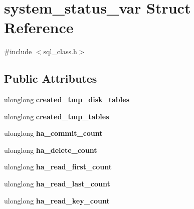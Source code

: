 \hypertarget{structsystem__status__var}{}\section{system\+\_\+status\+\_\+var Struct Reference}
\label{structsystem__status__var}


{\ttfamily \#include $<$sql\+\_\+class.\+h$>$}

\subsection*{Public Attributes}
\begin{DoxyCompactItemize}
\item 
\mbox{\label{structsystem__status__var_a622d653598bf89a392267564e390d94a}} 
ulonglong {\bfseries created\+\_\+tmp\+\_\+disk\+\_\+tables}
\item 
\mbox{\label{structsystem__status__var_a9b0a0c0bd7251ad1b611e9e6f4ef64b6}} 
ulonglong {\bfseries created\+\_\+tmp\+\_\+tables}
\item 
\mbox{\label{structsystem__status__var_ae0a16355cf94560a365511ff3f416ba1}} 
ulonglong {\bfseries ha\+\_\+commit\+\_\+count}
\item 
\mbox{\label{structsystem__status__var_a60240aa985935cc608c538121af845fb}} 
ulonglong {\bfseries ha\+\_\+delete\+\_\+count}
\item 
\mbox{\label{structsystem__status__var_a18509b3077dd53bba1520456c60abdba}} 
ulonglong {\bfseries ha\+\_\+read\+\_\+first\+\_\+count}
\item 
\mbox{\label{structsystem__status__var_a27891fa1efd3c64b22c2492a2e0f4dcf}} 
ulonglong {\bfseries ha\+\_\+read\+\_\+last\+\_\+count}
\item 
\mbox{\label{structsystem__status__var_a849b430e7cb7e5b4acb441646525094c}} 
ulonglong {\bfseries ha\+\_\+read\+\_\+key\+\_\+count}
\item 
\mbox{\label{structsystem__status__var_a514267556bb3487b71db4b7b8663f5a9}} 

\end{DoxyCompactItemize}
